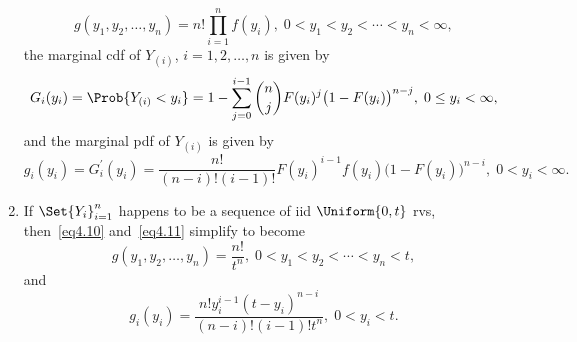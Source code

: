 \begin{Regular}
\begin{enumerate}[(1)]
              \[ g(y_{1}, y_{2}, \ldots, y_{n})=n ! \prod_{i=1}^{n} f(y_{i}),\; 0<y_{1}<y_{2}<\cdots<y_{n}<\infty,\label{eq4.10}\tag*{(4.10)} \]
              the marginal cdf of $ Y_{(i)} $, $ i=1,2,\ldots,n $ is given by
              \[ G_i(y_i)=\Prob{Y_{(i)}<y_i}
                  =1-\sum_{j=0}^{i-1}\binom{n}{j} F(y_i)^j\bigl(1-F(y_i)\bigr)^{n-j},\; 0\le y_i<\infty, \]
              and the marginal pdf of $ Y_{(i)} $ is given by
              \[ g_i(y_i)=G_i^\prime(y_i)=\frac{n!}{(n-i)!(i-1)!}
                  F(y_i)^{i-1}f(y_i)\bigl(1-F(y_i)\bigr)^{n-i},\; 0< y_i<\infty.\label{eq4.11}\tag*{(4.11)} \]
        \item If $ \Set{Y_i}_{i=1}^n $ happens to be a sequence of iid $ \Uniform{0,t} $ rvs, then~\ref{eq4.10}
              and~\ref{eq4.11} simplify to become
              \[ g(y_1,y_2,\ldots,y_n)=\frac{n!}{t^n},\;0<y_1<y_2<\cdots<y_n<t,\label{eq4.12}\tag*{(4.12)} \]
              and
              \[ g_i(y_i)=\frac{n!y_i^{i-1}(t-y_i)^{n-i}}{(n-i)!(i-1)!t^n},\; 0<y_i<t. \]
    \end{enumerate}
\end{Regular}
